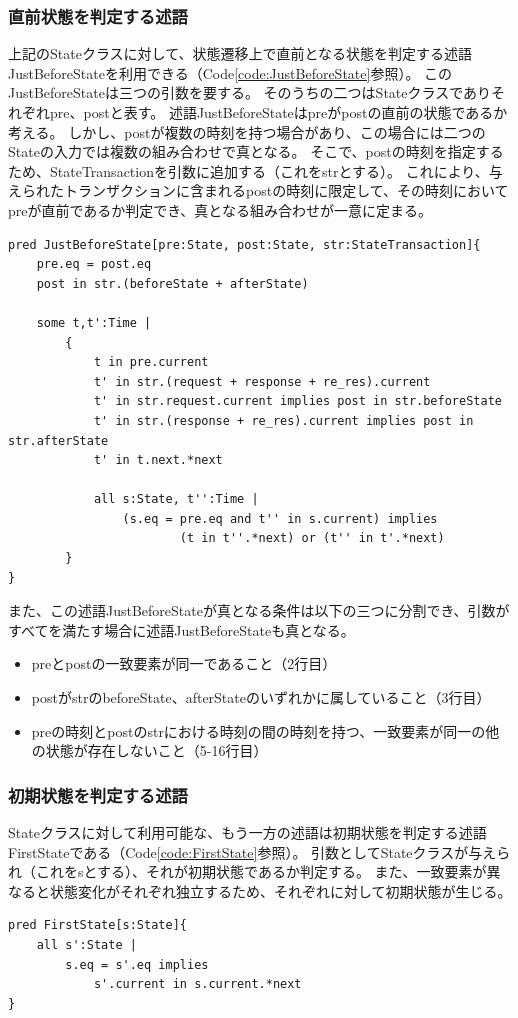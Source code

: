 \documentclass[12pt,a4paper]{jbook}
\begin{document}
\color{red}
\subsubsection{直前状態を判定する述語}
上記のStateクラスに対して、状態遷移上で直前となる状態を判定する述語JustBeforeStateを利用できる（Code\ref{code:JustBeforeState}参照）。
このJustBeforeStateは三つの引数を要する。
そのうちの二つはStateクラスでありそれぞれpre、postと表す。
述語JustBeforeStateはpreがpostの直前の状態であるか考える。
しかし、postが複数の時刻を持つ場合があり、この場合には二つのStateの入力では複数の組み合わせで真となる。
そこで、postの時刻を指定するため、StateTransactionを引数に追加する（これをstrとする）。
これにより、与えられたトランザクションに含まれるpostの時刻に限定して、その時刻においてpreが直前であるか判定でき、真となる組み合わせが一意に定まる。
\begin{lstlisting}[caption=状態遷移において直前の状態を判定する述語, label=code:JustBeforeState]
pred JustBeforeState[pre:State, post:State, str:StateTransaction]{
	pre.eq = post.eq
	post in str.(beforeState + afterState)

	some t,t':Time |
		{
			t in pre.current
			t' in str.(request + response + re_res).current
			t' in str.request.current implies post in str.beforeState
			t' in str.(response + re_res).current implies post in str.afterState
			t' in t.next.*next

			all s:State, t'':Time |
				(s.eq = pre.eq and t'' in s.current) implies
						(t in t''.*next) or (t'' in t'.*next)
		}
}
\end{lstlisting}

また、この述語JustBeforeStateが真となる条件は以下の三つに分割でき、引数がすべてを満たす場合に述語JustBeforeStateも真となる。
\begin{itemize}
\item preとpostの一致要素が同一であること（2行目）
\item postがstrのbeforeState、afterStateのいずれかに属していること（3行目）
\item preの時刻とpostのstrにおける時刻の間の時刻を持つ、一致要素が同一の他の状態が存在しないこと（5-16行目）
\end{itemize}

\subsubsection{初期状態を判定する述語}
Stateクラスに対して利用可能な、もう一方の述語は初期状態を判定する述語FirstStateである（Code\ref{code:FirstState}参照）。
引数としてStateクラスが与えられ（これをsとする）、それが初期状態であるか判定する。
また、一致要素が異なると状態変化がそれぞれ独立するため、それぞれに対して初期状態が生じる。
\begin{lstlisting}[caption=状態遷移において初期状態を判定する述語, label=code:FirstState]
pred FirstState[s:State]{
	all s':State |
		s.eq = s'.eq implies
			s'.current in s.current.*next
}
\end{lstlisting}
\color{black}
\end{document}
